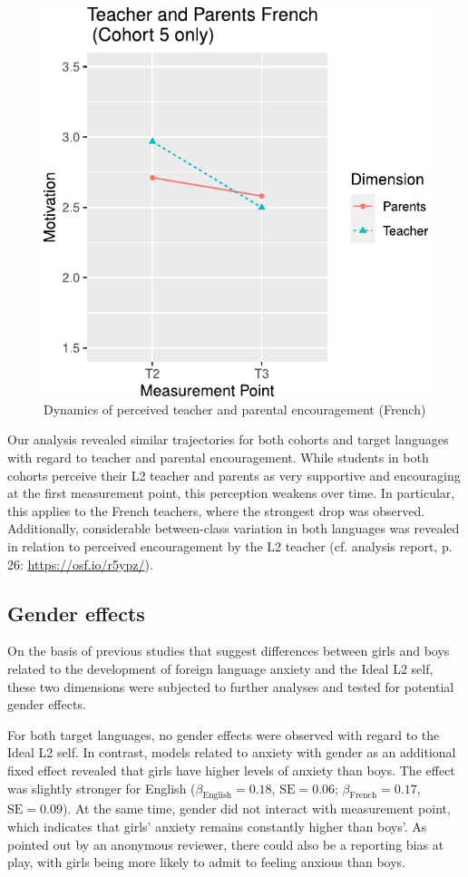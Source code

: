\documentclass[output=paper]{langsci/langscibook}
\begin{document}
  
\begin{figure}
\includegraphics[width=.5\textwidth]{figures/Fig8.4.pdf}
\caption{Dynamics of perceived teacher and parental encouragement (French)\label{fig:08:4}}
\end{figure}

Our analysis revealed similar trajectories for both cohorts and target languages with regard to teacher and parental encouragement. While students in both cohorts perceive their L2 teacher and parents as very supportive and encouraging at the first measurement point, this perception weakens over time. In particular, this applies to the French teachers, where the strongest drop was observed. Additionally, considerable between-class variation in both languages was revealed in relation to perceived encouragement by the L2 teacher (cf. analysis report, p. 26: \url{https://osf.io/r5ypz/}).

\subsection{Gender effects}

On the basis of previous studies that suggest differences between girls and boys related to the development of foreign language anxiety and the Ideal L2 self, these two dimensions were subjected to further analyses and tested for potential gender effects. 

For both target languages, no gender effects were observed with regard to the Ideal L2 self. In contrast, models related to anxiety with gender as an additional fixed effect revealed that girls have higher levels of anxiety than boys. The effect was slightly stronger for English ($\beta_{\text{English}}=0.18$, $\text{SE}=0.06$; \newline
 $\beta_{\text{French}}=0.17$, $\text{SE}=0.09$). At the same time, gender did not interact with measurement point, which indicates that girls’ anxiety remains constantly higher than boys’. As pointed out by an anonymous reviewer, there could also be a reporting bias at play, with girls being more likely to admit to feeling anxious than boys.
\end{document}
